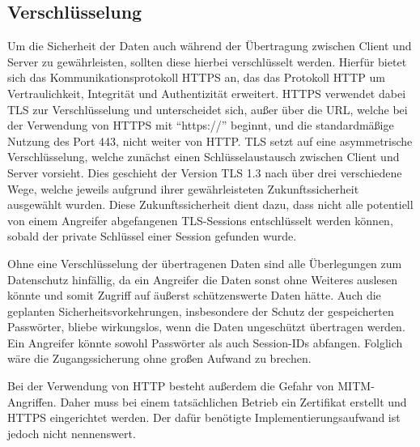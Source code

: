 \subsection{Verschlüsselung}

Um die Sicherheit der Daten auch während der Übertragung zwischen Client und Server zu gewährleisten, sollten diese hierbei verschlüsselt werden.
Hierfür bietet sich das Kommunikationsprotokoll \acs{HTTPS} an, das das Protokoll \acs{HTTP} um Vertraulichkeit, Integrität und Authentizität erweitert.
\acs{HTTPS} verwendet dabei \acs{TLS} zur Verschlüsselung und unterscheidet sich, außer über die \acs{URL}, welche bei der Verwendung von \acs{HTTPS} mit \enquote{https://} beginnt, und die standardmäßige Nutzung des Port 443, nicht weiter von \acs{HTTP}.
\acs{TLS} setzt auf eine asymmetrische Verschlüsselung, welche zunächst einen Schlüsselaustausch zwischen Client und Server vorsieht.
Dies geschieht der Version \acs{TLS} 1.3 nach über drei verschiedene Wege, welche jeweils aufgrund ihrer gewährleisteten Zukunftssicherheit ausgewählt wurden.
Diese Zukunftssicherheit dient dazu, dass nicht alle potentiell von einem Angreifer abgefangenen \acs{TLS}-Sessions entschlüsselt werden können, sobald der private Schlüssel einer Session gefunden wurde.\autocite{rf-RFC8446}

Ohne eine Verschlüsselung der übertragenen Daten sind alle Überlegungen zum Datenschutz hinfällig, da ein Angreifer die Daten sonst ohne Weiteres auslesen könnte und somit Zugriff auf äußerst schützenswerte Daten hätte.
Auch die geplanten Sicherheitsvorkehrungen, insbesondere der Schutz der gespeicherten Passwörter, bliebe wirkungslos, wenn die Daten ungeschützt übertragen werden.
Ein Angreifer könnte sowohl Passwörter als auch Session-IDs abfangen.
Folglich wäre die Zugangssicherung ohne großen Aufwand zu brechen.

Bei der Verwendung von \acs{HTTP} besteht außerdem die Gefahr von \ac{MITM}-Angriffen.
Daher muss bei einem tatsächlichen Betrieb ein Zertifikat erstellt und \acs{HTTPS} eingerichtet werden.
Der dafür benötigte Implementierungsaufwand ist jedoch nicht nennenswert.
